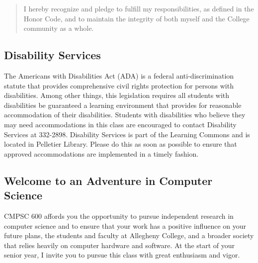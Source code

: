 \vspace*{-.1in}
\begin{quote}
I hereby recognize and pledge to fulfill my responsibilities, as defined in the Honor Code, and to maintain the
integrity of both myself and the College community as a whole.
\end{quote}
\vspace*{-.3in}

\subsection*{Disability Services}
\vspace*{-.05in}

The Americans with Disabilities Act (ADA) is a federal anti-discrimination statute that provides comprehensive civil
rights protection for persons with disabilities.  Among other things, this legislation requires all students with
disabilities be guaranteed a learning environment that provides for reasonable accommodation of their disabilities.
Students with disabilities who believe they may need accommodations in this class are encouraged to contact Disability
Services at 332-2898.  Disability Services is part of the Learning Commons and is located in Pelletier Library.
Please do this as soon as possible to ensure that approved accommodations are implemented in a timely fashion.

\vspace*{-.1in}
\subsection*{Welcome to an Adventure in Computer Science}


CMPSC 600 affords you the opportunity to pursue independent research in computer science and to ensure that your work
has a positive influence on your future plans, the students and faculty at Allegheny College, and a broader society that
relies heavily on computer hardware and software.  At the start of your senior year, I invite you to pursue this class
with great enthusiasm and vigor.

%

